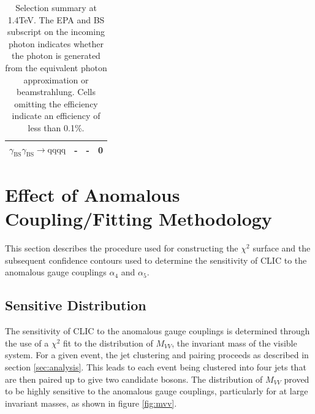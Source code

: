 \begin{table}[h!]
\begin{tabular}{ l r r r }
$\gamma_{\text{BS}}\gamma_{\text{BS}} \rightarrow \text{qqqq}$ & - & - & 0 \\
\hline
\end{tabular}
\caption[Selection summary at 1.4TeV.   The EPA and BS subscript on the incoming photon indicates whether the photon is generated from the equivalent photon approximation or beamstrahlung.  Cells omitting the efficiency indicate an efficiency of less than 0.1\%.]{Selection summary at 1.4TeV.   The EPA and BS subscript on the incoming photon indicates whether the photon is generated from the equivalent photon approximation or beamstrahlung.  Cells omitting the efficiency indicate an efficiency of less than 0.1\%.}
\label{table:selectionsummary1400GeV}
\end{table}


\section{Effect of Anomalous Coupling/Fitting Methodology}
\label{sec:fitting}
This section describes the procedure used for constructing the $\chi^{2}$ surface and the subsequent confidence contours used to determine the sensitivity of CLIC to the anomalous gauge couplings $\alpha_{4}$ and $\alpha_{5}$.


\subsection{Sensitive Distribution}
The sensitivity of CLIC to the anomalous gauge couplings is determined through the use of a $\chi^{2}$ fit to the distribution of $M_{VV}$, the invariant mass of the visible system.  For a given event, the jet clustering and pairing proceeds as described in section \ref{sec:analysis}.  This leads to each event being clustered into four jets that are then paired up to give two candidate bosons.  The distribution of $M_{VV}$ proved to be highly sensitive to the anomalous gauge couplings, particularly for at large invariant masses, as shown in figure \ref{fig:mvv}.

